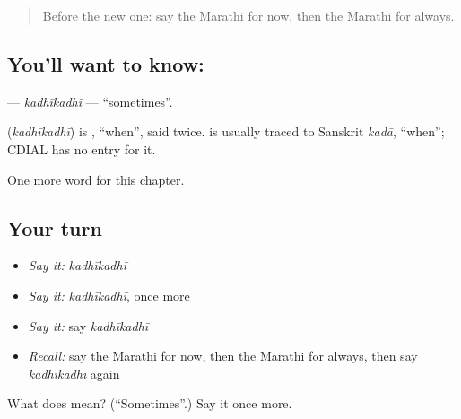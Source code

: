 \begin{quote}
Before the new one: say the Marathi for now, then the Marathi for always.
\end{quote}

\subsection*{You'll want to know: }
\textbf{} — \emph{kadhīkadhī} — \textquotedblleft{}sometimes\textquotedblright{}.

\begin{cousinweb}
\textbf{} (\emph{kadhīkadhī}) is \textbf{}, \textquotedblleft{}when\textquotedblright{}, said twice. \textbf{} is usually traced to Sanskrit \emph{kadā}, \textquotedblleft{}when\textquotedblright{}; CDIAL has no entry for it.
\end{cousinweb}

\begin{grammarlens}[title={What you've built}]
One more word for this chapter.
\end{grammarlens}

\subsection*{Your turn}
\begin{itemize}
\raggedright
  \item \emph{Say it:} \emph{kadhīkadhī}
  \item \emph{Say it:} \emph{kadhīkadhī}, once more
  \item \emph{Say it:} say \emph{kadhīkadhī}
  \item \emph{Recall:} say the Marathi for now, then the Marathi for always, then say \emph{kadhīkadhī} again
\end{itemize}

\begin{tcolorbox}[breakable,colback=teal!4,colframe=teal!35!black,title={Before you move on}]
What does  mean? (\textquotedblleft{}Sometimes\textquotedblright{}.) Say it once more.
\end{tcolorbox}
